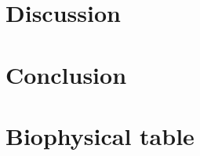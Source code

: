 \documentclass[12pt]{iopart}
\begin{document}




\section{Discussion}

\section{Conclusion}


\appendix

\section{Biophysical table}
\label{sec:biophysical-table}

\end{document}
